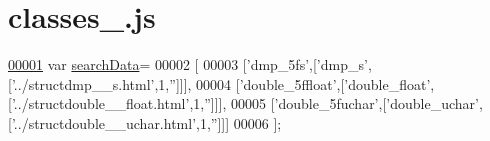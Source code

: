 \hypertarget{classes__2_8js_source}{}\section{classes\+\_.\+js}
\label{classes__2_8js_source}

\begin{DoxyCode}
\hypertarget{classes__2_8js_source.tex_l00001}{}\hyperlink{classes__2_8js_ad01a7523f103d6242ef9b0451861231e}{00001} var \hyperlink{classes__2_8js_ad01a7523f103d6242ef9b0451861231e}{searchData}=
00002 [
00003   [\textcolor{stringliteral}{'dmp\_5fs'},[\textcolor{stringliteral}{'dmp\_s'},[\textcolor{stringliteral}{'../structdmp\_\_s.html'},1,\textcolor{stringliteral}{''}]]],
00004   [\textcolor{stringliteral}{'double\_5ffloat'},[\textcolor{stringliteral}{'double\_float'},[\textcolor{stringliteral}{'../structdouble\_\_float.html'},1,\textcolor{stringliteral}{''}]]],
00005   [\textcolor{stringliteral}{'double\_5fuchar'},[\textcolor{stringliteral}{'double\_uchar'},[\textcolor{stringliteral}{'../structdouble\_\_uchar.html'},1,\textcolor{stringliteral}{''}]]]
00006 ];
\end{DoxyCode}
